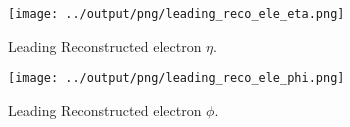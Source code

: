 \documentclass[11pt]{book}
\begin{document}
\begin{figure}[ht]
\centering
\texttt{[image: ../output/png/leading\_reco\_ele\_eta.png]}
\caption{Leading Reconstructed electron $\eta$.}
\label{fig:leading_reco_ele_eta}
\end{figure}

\begin{figure}[ht]
\centering
\texttt{[image: ../output/png/leading\_reco\_ele\_phi.png]}
\caption{Leading Reconstructed electron $\phi$.}
\label{fig:leading_reco_ele_phi}
\end{figure}
\clearpage

\end{document}
